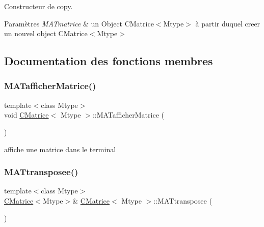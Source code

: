 Constructeur de copy. 


\begin{DoxyParams}{Paramètres}
{\em M\+A\+Tmatrice} & un Object C\+Matrice$<$\+Mtype$>$ à partir duquel creer un nouvel object C\+Matrice$<$\+Mtype$>$ \\
\hline
\end{DoxyParams}


\subsection{Documentation des fonctions membres}
\mbox{\label{classCMatrice_a448fbaa3f221b599abeb8abf3f289881}} 
\subsubsection{\texorpdfstring{M\+A\+Tafficher\+Matrice()}{MATafficherMatrice()}}
{\footnotesize\ttfamily template$<$class Mtype$>$ \\
void \hyperlink{classCMatrice}{C\+Matrice}$<$ Mtype $>$\+::M\+A\+Tafficher\+Matrice (\begin{DoxyParamCaption}{ }\end{DoxyParamCaption})\hspace{0.3cm}{\ttfamily [inline]}}



affiche une matrice dans le terminal 

\mbox{\label{classCMatrice_a0beb5a380bc021fa6abc352fc3d032b7}} 
\subsubsection{\texorpdfstring{M\+A\+Ttransposee()}{MATtransposee()}}
{\footnotesize\ttfamily template$<$class Mtype$>$ \\
\hyperlink{classCMatrice}{C\+Matrice}$<$Mtype$>$\& \hyperlink{classCMatrice}{C\+Matrice}$<$ Mtype $>$\+::M\+A\+Ttransposee (\begin{DoxyParamCaption}{ }\end{DoxyParamCaption})\hspace{0.3cm}{\ttfamily [inline]}}



